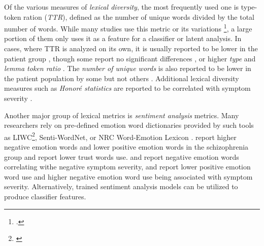 Of the various measures of \textit{lexical diversity}, the most frequently used one is type-token ration (\textit{TTR}), defined as the number of unique words divided by the total number of words. While many studies use this metric or its variations \footnote{\cite{rosenstein2015language, willits2018evidence, kramov2020evaluating, hitczenko2021understanding, liang2022widespread, aich2022towards, ziv2022morphological, jeong2023exploring, minor2023automated, schneider2023syntactic, tang2023latent}.}, a large portion of them only uses it as a feature for a classifier or latent analysis. In cases, where TTR is analyzed on its own, it is usually reported to be lower in the patient group \citep{willits2018evidence, aich2022towards, minor2023automated}, though some report no significant differences \citep{hitczenko2021understanding, jeong2023exploring, schneider2023syntactic}, or higher \textit{type} and \textit{lemma token ratio} \citep{ziv2022morphological}. The \textit{number of unique words} is also reported to be lower in the patient population by some \citep{willits2018evidence} but not others \citep{schneider2023syntactic}. Additional lexical diversity measures such as \textit{Honoré statistics} are reported to be correlated with symptom severity \citep{jeong2023exploring}. 

Another major group of lexical metrics is \textit{sentiment analysis} metrics. Many researchers rely on pre-defined emotion word dictionaries provided by such tools as LIWC\footnote{\cite{mitchell2015quantifying, vail2018toward, girard2022computational, mota2022happy, minor2023automated}}, Senti-WordNet, or NRC Word-Emotion Lexicon \citep{aich2022towards}. \citet{mitchell2015quantifying} report higher negative emotion words and lower positive emotion words in the schizophrenia group and \citet{aich2022towards} report lower trust words use. \citet{vail2018toward} and \citet{girard2022computational} report negative emotion words correlating withe negative symptom severity, and \citet{minor2023automated} report lower positive emotion word use and higher negative emotion word use being associated with symptom severity. Alternatively, trained sentiment analysis models can be utilized \citep{tang2022clinical, tang2023latent} to produce classifier features.


